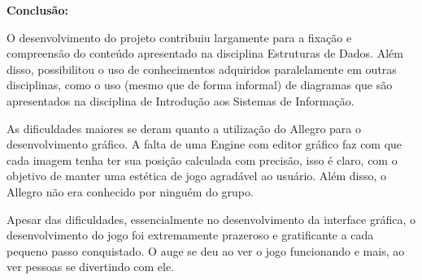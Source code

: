 \documentclass[a4paper]{article}
\begin{document}
\bigskip


\bigskip


\bigskip


\bigskip


\bigskip


\bigskip


\bigskip


\bigskip


\bigskip


\bigskip

\textbf{Conclusão:}

O desenvolvimento do projeto contribuiu largamente para a fixação e
compreensão do conteúdo apresentado na disciplina Estruturas de Dados.
Além disso, possibilitou o uso de conhecimentos adquiridos
paralelamente em outras disciplinas, como o uso (mesmo que de forma
informal) de diagramas que são apresentados na disciplina de Introdução
aos Sistemas de Informação.

As dificuldades maiores se deram quanto a utilização do Allegro para o
desenvolvimento gráfico. A falta de uma Engine com editor gráfico faz
com que cada imagem tenha ter sua posição calculada com precisão, isso
é claro, com o objetivo de manter uma estética de jogo agradável ao
usuário. Além disso, o Allegro não era conhecido por ninguém do grupo.

Apesar das dificuldades, essencialmente no desenvolvimento da interface
gráfica, o desenvolvimento do jogo foi extremamente prazeroso e
gratificante a cada pequeno passo conquistado. O auge se deu ao ver o
jogo funcionando e mais, ao ver pessoas se divertindo com ele. 
\end{document}
